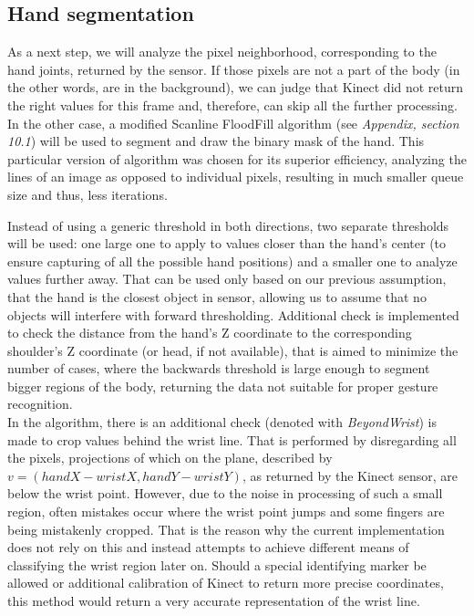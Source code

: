 \documentclass[a4paper,11pt,oneside]{article}
\begin{document}
\subsection{Hand segmentation}

As a next step, we will analyze the pixel neighborhood, corresponding to the hand joints, returned by the sensor. If those pixels are not a part of the body (in the other words, are in the background), we can judge that Kinect did not return the right values for this frame and, therefore, can skip all the further processing. In the other case, a modified Scanline FloodFill algorithm (see \textit{Appendix, section 10.1}) will be used to segment and draw the binary mask of the hand. This particular version of algorithm was chosen for its superior efficiency, analyzing the lines of an image as opposed to individual pixels, resulting in much smaller queue size and thus, less iterations.

Instead of using a generic threshold in both directions, two separate thresholds will be used: one large one to apply to values closer than the hand's center (to ensure capturing of all the possible hand positions) and a smaller one to analyze values further away. That can be used only based on our previous assumption, that the hand is the closest object in sensor, allowing us to assume that no objects will interfere with forward thresholding. Additional check is implemented to check the distance from the hand's Z coordinate to the corresponding shoulder's Z coordinate (or head, if not available), that is aimed to minimize the number of cases, where the backwards threshold is large enough to segment bigger regions of the body, returning the data not suitable for proper gesture recognition.\\

In the algorithm, there is an additional check (denoted with \textit{BeyondWrist}) is made to crop values behind the wrist line. That is performed by disregarding all the pixels, projections of which on the plane, described by $v = (handX - wristX, handY - wristY)$, as returned by the Kinect sensor, are below the wrist point. However, due to the noise in processing of such a small region, often mistakes occur where the wrist point jumps and some fingers are being mistakenly cropped. That is the reason why the current implementation does not rely on this and instead attempts to achieve different means of classifying the wrist region later on. Should a special identifying marker be allowed or additional calibration of Kinect  to return more precise coordinates, this method would return a very accurate representation of the wrist line.
\end{document}
